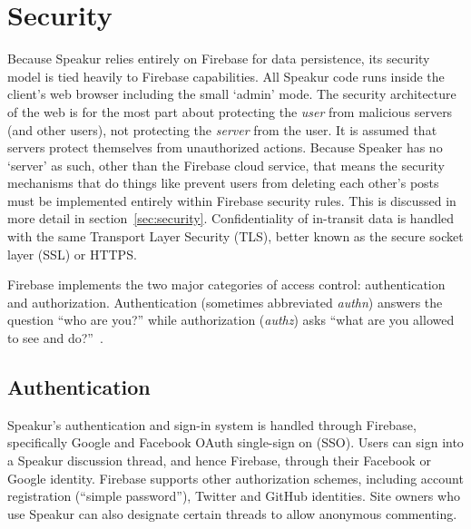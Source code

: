 \section{Security}
\label{sec:arch_security}
Because Speakur relies entirely on Firebase for data persistence, its security model is tied heavily to Firebase capabilities. 
All Speakur code runs inside the client's web browser including the small `admin' mode.
The security architecture of the web is for the most part about protecting the \textit{user} from malicious servers (and other users), not protecting the \textit{server} from the user.
It is assumed that servers protect themselves from unauthorized actions.
Because Speaker has no `server' as such, 
other than the Firebase cloud service,
that means the security mechanisms that do things like prevent users from deleting each other's posts 
must be implemented entirely within Firebase security rules.
This is discussed in more detail in section~\ref{sec:security}.
Confidentiality of in-transit data is handled with the same Transport Layer Security (TLS), 
better known as the secure socket layer (SSL) or HTTPS.

Firebase implements the two major categories of access control: authentication and 
authorization. 
Authentication (sometimes abbreviated \textit{authn}) answers the question ``who are you?'' 
while authorization (\textit{authz}) asks ``what are you allowed to see and do?''~\cite{stallings2011}.


\subsection{Authentication}

Speakur's authentication and sign-in system is handled through Firebase, 
specifically Google and Facebook OAuth single-sign on (SSO).
Users can sign into a Speakur discussion thread, and hence Firebase, through their Facebook or Google identity.
Firebase supports other authorization schemes, including account registration (``simple password''), Twitter and GitHub identities.
Site owners who use Speakur can also designate certain threads to allow anonymous commenting.


